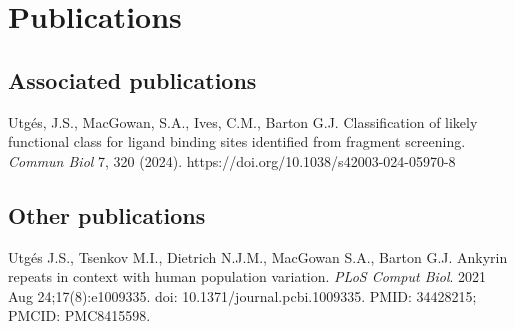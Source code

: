 \chapter*{Publications}

\section*{Associated publications}

Utgés, J.S., MacGowan, S.A., Ives, C.M., Barton G.J. Classification of likely functional class for ligand binding sites identified from fragment screening. \textit{Commun Biol} 7, 320 (2024). https://doi.org/10.1038/s42003-024-05970-8

\section*{Other publications}

Utgés J.S., Tsenkov M.I., Dietrich N.J.M., MacGowan S.A., Barton G.J. Ankyrin repeats in context with human population variation. \textit{PLoS Comput Biol}. 2021 Aug 24;17(8):e1009335. doi: 10.1371/journal.pcbi.1009335. PMID: 34428215; PMCID: PMC8415598.